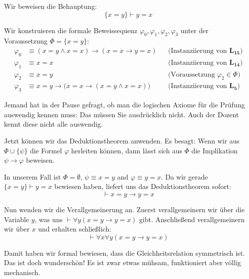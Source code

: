 \begin{math-stroke}
Wir beweisen die Behauptung:
\[ \{x = y\} \vdash y = x \]

\begin{short-proof}
Wir konstruieren die formale Beweissequenz $\varphi_0, \varphi_1, \varphi_2, \varphi_3$ unter der Voraussetzung $\Phi = \{x = y\}$:
\begin{align}
\varphi_0 &\equiv (x = y \wedge x = x) \rightarrow (x = x \rightarrow y = x) && \text{(Instanziierung von $\mathbf{L_{15}}$)} \label{eq:sym-step0} \\
\varphi_1 &\equiv x = x && \text{(Instanziierung von $\mathbf{L_{14}}$)} \label{eq:sym-step1} \\
\varphi_2 &\equiv x = y && \text{(Voraussetzung $\varphi_2 \in \Phi$)} \label{eq:sym-step2} \\
\varphi_3 &\equiv x = y \rightarrow \bigl(x = x \rightarrow (x = y \wedge x = x)\bigr) && \text{(Instanziierung von $\mathbf{L_5}$)} \label{eq:sym-step3}
\end{align}
\end{short-proof}
\end{math-stroke}

\begin{spoken-clean}
Jemand hat in der Pause gefragt, ob man die logischen Axiome für die Prüfung auswendig kennen muss: Das müssen Sie ausdrücklich nicht. Auch der Dozent kennt diese nicht alle auswendig.
\end{spoken-clean}

\begin{spoken-clean}[01:01:12 - 01:02:27]
Jetzt können wir das Deduktionstheorem anwenden. Es besagt: Wenn wir aus $\Phi \cup \{\psi\}$ die Formel $\varphi$ herleiten können, dann lässt sich aus $\Phi$ die Implikation $\psi \rightarrow \varphi$ beweisen. 

In unserem Fall ist $\Phi = \emptyset$, $\psi \equiv x = y$ and $\varphi \equiv y = x$. Da wir gerade $\{x = y\} \vdash y = x$ bewiesen haben, liefert uns das Deduktionstheorem sofort:
\[ \vdash x = y \rightarrow y = x \]

Nun wenden wir die Verallgemeinerung an. Zuerst verallgemeinern wir über die Variable $y$, was uns $\vdash \forall y (x = y \rightarrow y = x)$ gibt. Anschließend verallgemeinern wir über $x$ und erhalten schließlich:
\[ \vdash \forall x \forall y (x = y \rightarrow y = x) \]

Damit haben wir formal bewiesen, dass die Gleichheitsrelation symmetrisch ist. Das ist doch wunderschön! Es ist zwar etwas mühsam, funktioniert aber völlig mechanisch.
\end{spoken-clean}

